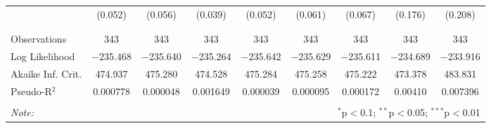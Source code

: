 \documentclass[12pt]{article}
\begin{document}
\begin{table}[!htbp]
\begin{adjustbox}{width=\textwidth}
\begin{tabular}{@{\extracolsep{5pt}}lcccccccc}
  & (0.052) & (0.056) & (0.039) & (0.052) & (0.061) & (0.067) & (0.176) & (0.208) \\ 
  & & & & & & & & \\ 
\hline \\[-1.8ex] 
Observations & 343 & 343 & 343 & 343 & 343 & 343 & 343 & 343 \\ 
Log Likelihood & $-$235.468 & $-$235.640 & $-$235.264 & $-$235.642 & $-$235.629 & $-$235.611 & $-$234.689 & $-$233.916 \\ 
Akaike Inf. Crit. & 474.937 & 475.280 & 474.528 & 475.284 & 475.258 & 475.222 & 473.378 & 483.831 \\ 
Pseudo-R$^{2}$ & 0.000778 & 0.000048 & 0.001649 & 0.000039 & 0.000095 & 0.000172 & 0.00410 & 0.007396 \\
\hline 
\hline \\[-1.8ex] 
\textit{Note:}  & \multicolumn{8}{r}{$^{*}$p$<$0.1; $^{**}$p$<$0.05; $^{***}$p$<$0.01} \\ 
\end{tabular} 
\end{adjustbox}
\end{table} 
\end{document}
